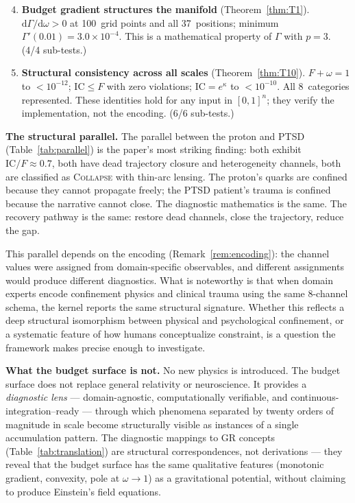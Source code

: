\documentclass[
  aps,
  prd,
  twocolumn,
  superscriptaddress,
  nofootinbib,
  floatfix
]{revtex4-2}
\newcommand{\Gam}{\Gamma}
\newcommand{\dd}{\mathrm{d}}
\newcommand{\regime}[1]{\textsc{#1}}
\newcommand{\IC}{\mathrm{IC}}
\begin{document}
\begin{enumerate}\setcounter{enumi}{3}
\item \textbf{Budget gradient structures the manifold}
  (Theorem~\ref{thm:T1}).
  $\dd\Gam/\dd\omega > 0$ at 100~grid points and all
  37~positions; minimum $\Gam'(0.01) = 3.0 \times 10^{-4}$.
  This is a mathematical property of $\Gam$ with $p = 3$.
  (4/4 sub-tests.)

\item \textbf{Structural consistency across all scales}
  (Theorem~\ref{thm:T10}).
  $F + \omega = 1$ to $< 10^{-12}$; $\IC \leq F$ with zero
  violations; $\IC = e^{\kappa}$ to $< 10^{-10}$.  All
  8~categories represented.  These identities hold for any
  input in $[0,1]^n$; they verify the implementation, not
  the encoding.  (6/6 sub-tests.)
\end{enumerate}

\textbf{The structural parallel.}
The parallel between the proton and PTSD
(Table~\ref{tab:parallel}) is the paper's most striking
finding: both exhibit $\IC/F \approx 0.7$, both have dead
trajectory closure and heterogeneity channels, both are
classified as \regime{Collapse} with thin-arc lensing.  The
proton's quarks are confined because they cannot propagate
freely; the PTSD patient's trauma is confined because the
narrative cannot close.  The diagnostic mathematics is the
same.  The recovery pathway is the same: restore dead
channels, close the trajectory, reduce the gap.

This parallel depends on the encoding
(Remark~\ref{rem:encoding}): the channel values were
assigned from domain-specific observables, and different
assignments would produce different diagnostics.  What is
noteworthy is that when domain experts encode confinement
physics and clinical trauma using the same 8-channel schema,
the kernel reports the same structural signature.  Whether
this reflects a deep structural isomorphism between physical
and psychological confinement, or a systematic feature of how
humans conceptualize constraint, is a question the framework
makes precise enough to investigate.

\textbf{What the budget surface is not.}
No new physics is introduced.  The budget surface does not
replace general relativity or neuroscience.  It provides a
\emph{diagnostic lens} --- domain-agnostic, computationally
verifiable, and continuous-integration--ready --- through which
phenomena separated by twenty orders of magnitude in scale
become structurally visible as instances of a single
accumulation pattern.  The diagnostic mappings to GR concepts
(Table~\ref{tab:translation}) are structural correspondences,
not derivations --- they reveal that the budget surface has
the same qualitative features (monotonic gradient,
convexity, pole at $\omega \to 1$) as a gravitational
potential, without claiming to produce Einstein's field
equations.
\end{document}
